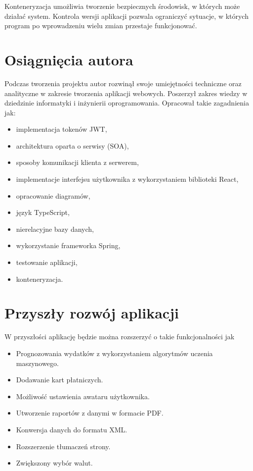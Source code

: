 Konteneryzacja umożliwia tworzenie bezpiecznych środowisk, w których może działać system.
Kontrola wersji aplikacji pozwala ograniczyć sytuacje, w których program po wprowadzeniu wielu zmian przestaje funkcjonować. 

\section*{Osiągnięcia autora}
Podczas tworzenia projektu autor rozwinął swoje umiejętności techniczne oraz analityczne w zakresie tworzenia aplikacji webowych. Poszerzył zakres wiedzy w dziedzinie informatyki i inżynierii oprogramowania. Opracował takie zagadnienia jak:
\begin{itemize}
	\item implementacja tokenów JWT,
	\item architektura oparta o serwisy (SOA),
	\item sposoby komunikacji klienta z serwerem, 
	\item implementacje interfejsu użytkownika z wykorzystaniem biblioteki React,
	\item opracowanie diagramów,
	\item język TypeScript,
	\item nierelacyjne bazy danych,
	\item wykorzystanie frameworka Spring,
	\item testowanie aplikacji,
	\item konteneryzacja.
\end{itemize}   
\section*{Przyszły rozwój aplikacji}
W przyszłości aplikację będzie można rozszerzyć o takie funkcjonalności jak 
\begin{itemize}
	\item Prognozowania wydatków z wykorzystaniem algorytmów uczenia maszynowego.
	\item Dodawanie kart płatniczych.
	\item Możliwość ustawienia awataru użytkownika.
	\item Utworzenie raportów z danymi w formacie PDF.
	\item Konwersja danych do formatu XML.
	\item Rozszerzenie tłumaczeń strony.
	\item Zwiększony wybór walut.
\end{itemize}
